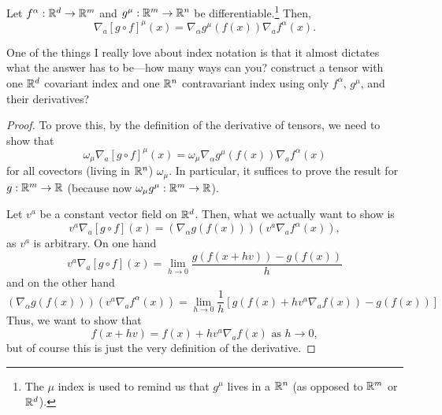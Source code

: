 \begin{prp}\label{ChainRule}
Let $f^\alpha :\mathbb{R} ^d\rightarrow \mathbb{R} ^m$ and $g^\mu :\mathbb{R} ^m\rightarrow \mathbb{R} ^n$ be differentiable.\footnote{The $\mu$ index is used to remind us that $g^\mu$ lives in a $\mathbb{R} ^n$ (as opposed to $\mathbb{R} ^m$ or $\mathbb{R} ^d$).}  Then,
\begin{equation}
\nabla _a[g\circ f]^\mu (x)=\nabla _\alpha g^\mu (f(x))\nabla _af^\alpha (x).
\end{equation}
\begin{rmk}
One of the things I really love about index notation is that it almost dictates what the answer has to be---how many ways can you? construct a tensor with one $\mathbb{R} ^d$ covariant index and one $\mathbb{R} ^n$ contravariant index using only $f^\alpha$, $g^\mu$, and their derivatives?
\end{rmk}
\begin{proof}
To prove this, by the definition of the derivative of tensors, we need to show that
\begin{equation}
\omega _\mu \nabla _a[g\circ f]^\mu (x)=\omega _\mu \nabla _\alpha g^\mu (f(x))\nabla _af^\alpha (x)
\end{equation}
for all covectors (living in $\mathbb{R} ^n$) $\omega _\mu$.  In particular, it suffices to prove the result for $g:\mathbb{R} ^m\rightarrow \mathbb{R}$ (because now $\omega _\mu g^\mu :\mathbb{R} ^m\rightarrow \mathbb{R}$).

Let $v^a$ be a constant vector field on $\mathbb{R} ^d$.  Then, what we actually want to show is
\begin{equation}
v^a\nabla _a[g\circ f](x)=\left( \nabla _\alpha g(f(x))\right) \left( v^a\nabla _af^\alpha (x)\right) ,
\end{equation}
as $v^a$ is arbitrary.  On one hand
\begin{equation}\label{5.2.18}
v^a\nabla _a[g\circ f](x)=\lim _{h\to 0}\frac{g\left( f(x+hv)\right) -g(f(x))}{h}
\end{equation}
and on the other hand
\begin{equation}
\left( \nabla _\alpha g(f(x))\right) \left( v^a\nabla _af^\alpha (x)\right) =\lim _{h\to 0}\frac{1}{h}\left[ g\left( f(x)+hv^a\nabla _af(x)\right) -g(f(x))\right]
\end{equation}
Thus, we want to show that
\begin{equation}
f(x+hv)=f(x)+hv^a\nabla _af(x)\text{ as }h\to 0,
\end{equation}
but of course this is just the very definition of the derivative.
\end{proof}
\end{prp}

